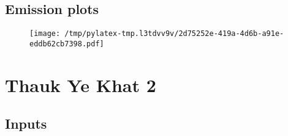 \documentclass{article}%
\begin{document}
\subsection{Emission plots}%
\label{subsec:Emissionplots}%


\begin{figure}[htbp]%
\centering%
\texttt{[image: /tmp/pylatex-tmp.l3tdvv9v/2d75252e-419a-4d6b-a91e-eddb62cb7398.pdf]}%
\end{figure}

%
\section{Thauk Ye Khat 2}%
\label{sec:ThaukYeKhat2}%
\subsection{Inputs}%
\label{subsec:Inputs}%
\end{document}
